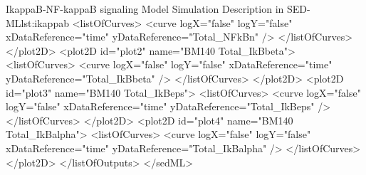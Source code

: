 \begin{myXmlLst}{IkappaB-NF-kappaB signaling Model Simulation Description in SED-ML}{lst:ikappab}
      <listOfCurves>
        <curve logX="false" logY="false" xDataReference="time" 
        yDataReference="Total_NFkBn" />
      </listOfCurves>
    </plot2D>
    <plot2D id="plot2" name="BM140 Total_IkBbeta">
      <listOfCurves>
        <curve logX="false" logY="false" xDataReference="time"
        yDataReference="Total_IkBbeta" />
      </listOfCurves>
    </plot2D>
    <plot2D id="plot3" name="BM140 Total_IkBeps">
      <listOfCurves>
        <curve logX="false" logY="false" xDataReference="time"
        yDataReference="Total_IkBeps" />
      </listOfCurves>
    </plot2D>
    <plot2D id="plot4" name="BM140 Total_IkBalpha">
      <listOfCurves>
        <curve logX="false" logY="false" xDataReference="time" 
        yDataReference="Total_IkBalpha" />
      </listOfCurves>
    </plot2D>
  </listOfOutputs>
</sedML>
\end{myXmlLst}



